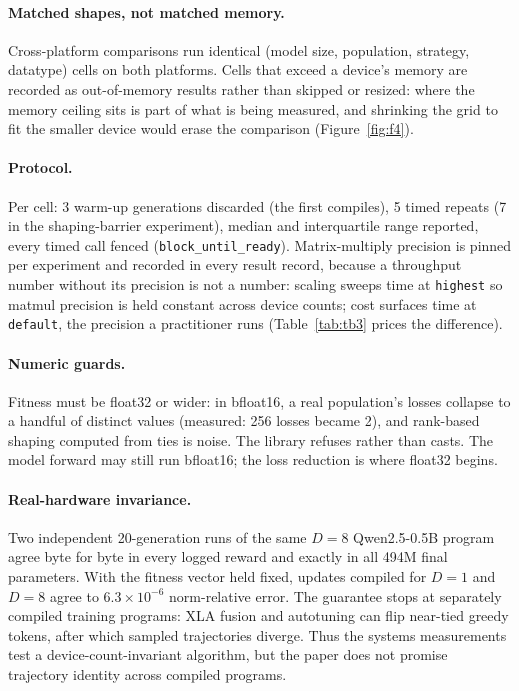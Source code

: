 \paragraph{Matched shapes, not matched memory.} Cross-platform comparisons
run identical (model size, population, strategy, datatype) cells on both
platforms. Cells that exceed a device's memory are recorded as
out-of-memory results rather than skipped or resized: where the memory
ceiling sits is part of what is being measured, and shrinking the grid to
fit the smaller device would erase the comparison
(Figure~\ref{fig:f4}).

\paragraph{Protocol.} Per cell: 3 warm-up generations discarded (the first
compiles), 5 timed repeats (7 in the shaping-barrier experiment), median and
interquartile range reported, every
timed call fenced (\texttt{block\_until\_ready}). Matrix-multiply precision
is pinned per experiment and recorded in every result record, because a
throughput number without its precision is not a number: scaling sweeps time
at \texttt{highest} so matmul precision is held constant across device counts;
cost surfaces time at \texttt{default}, the precision a practitioner runs
(Table~\ref{tab:tb3} prices the difference).

\paragraph{Numeric guards.} Fitness must be float32 or wider: in bfloat16, a
real population's losses collapse to a handful of distinct values (measured:
256 losses became 2), and rank-based shaping computed from ties is noise.
The library refuses rather than casts. The model forward may still run
bfloat16; the loss reduction is where float32 begins.

\paragraph{Real-hardware invariance.} Two independent 20-generation runs of
the same $D{=}8$ Qwen2.5-0.5B program agree byte for byte in every logged
reward and exactly in all 494M final parameters. With the fitness vector held
fixed, updates compiled for $D{=}1$ and $D{=}8$ agree to
$6.3\times10^{-6}$ norm-relative error. The guarantee stops at separately
compiled training programs: XLA fusion and autotuning can flip near-tied
greedy tokens, after which sampled trajectories diverge. Thus the systems
measurements test a device-count-invariant algorithm, but the paper does not
promise trajectory identity across compiled programs.

